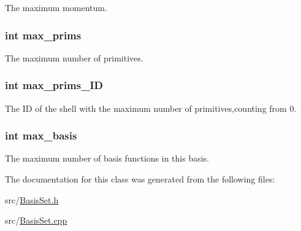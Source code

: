 The maximum momentum. \hypertarget{classJKBuilder_1_1BasisSet_aeb188680b23f4d32ea9a65468e5ba71d}{
\subsubsection[{max\_\-prims}]{\setlength{\rightskip}{0pt plus 5cm}int {\bf max\_\-prims}}}
\label{classJKBuilder_1_1BasisSet_aeb188680b23f4d32ea9a65468e5ba71d}


The maximum number of primitives. \hypertarget{classJKBuilder_1_1BasisSet_acdabb925780e7292114dfa2ace8b9d8e}{
\subsubsection[{max\_\-prims\_\-ID}]{\setlength{\rightskip}{0pt plus 5cm}int {\bf max\_\-prims\_\-ID}}}
\label{classJKBuilder_1_1BasisSet_acdabb925780e7292114dfa2ace8b9d8e}


The ID of the shell with the maximum number of primitives,counting from 0. \hypertarget{classJKBuilder_1_1BasisSet_af29e85e56ea63952fc7a1ede8d10426f}{
\subsubsection[{max\_\-basis}]{\setlength{\rightskip}{0pt plus 5cm}int {\bf max\_\-basis}}}
\label{classJKBuilder_1_1BasisSet_af29e85e56ea63952fc7a1ede8d10426f}


The maximum number of basis functions in this basis. 

The documentation for this class was generated from the following files:\begin{DoxyCompactItemize}
\item 
src/\hyperlink{BasisSet_8h}{BasisSet.h}\item 
src/\hyperlink{BasisSet_8cpp}{BasisSet.cpp}\end{DoxyCompactItemize}
